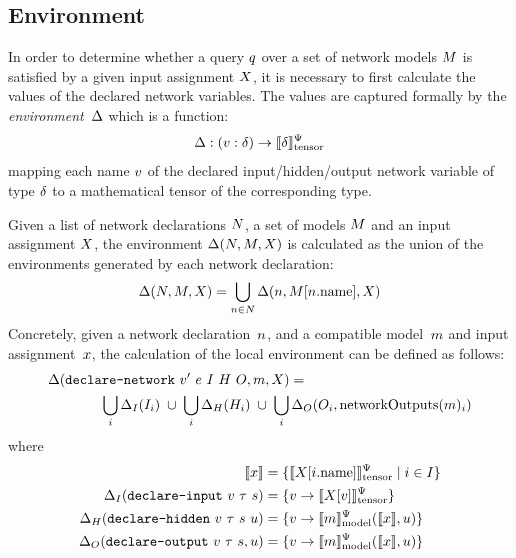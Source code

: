 \subsection{Environment}
\label{sec:semantic-context}

In order to determine whether a query $q$ over a set of network models $M$ is satisfied by a given input assignment $X$, it is necessary to first calculate the values of the declared network variables. 
The values are captured formally by the \emph{environment}~$\Delta$ which is a function:
\begin{equation*}
\Delta : (v : \delta) \rightarrow \llbracket \delta \rrbracket_\text{tensor}^\Psi
\end{equation*}
mapping each name $v$ of the declared input/hidden/output network variable of type $\delta$ to a mathematical tensor of the corresponding type.

Given a list of network declarations $N$, a set of models $M$ and an input assignment $X$, the environment $\Delta (N, M, X)$ is calculated as the union of the environments generated by each network declaration:
\begin{equation*}
\Delta (N, M, X) = \bigcup_{n \in N} \Delta (n, M[n.\text{name}], X)
\end{equation*}
Concretely, given a network declaration~$n$, and a compatible model~$m$ and input assignment~$x$, the calculation of the local environment can be defined as follows:
\begin{align*}
\Delta (\texttt{declare-network} ~ v' ~ e ~ I ~ H ~ O, m, X) =
\qquad\qquad\qquad\qquad\qquad\qquad
\\ 
\bigcup_{i} \Delta_{I}(I_i) \; \cup \;
\bigcup_{i} \Delta_{H}(H_i) \; \cup \; 
\bigcup_{i} \Delta_{O}(O_i, \text{networkOutputs}(m)_i)
\end{align*}
where
\newcommand{\nameFn}[1]{\text{name}(#1)}
\newcommand{\hiddenNameFn}[1]{\text{hiddenName}(#1)}
{\small
\begin{align*}
    \llbracket x \rrbracket 
    &= \{\llbracket X[i.\text{name}] \rrbracket_\text{tensor}^\Psi \mid i \in I \}
    \\
    \Delta_{I}(\texttt{declare-input} ~ v ~ \tau ~ s) 
    &= \{ v \rightarrow \llbracket X[v] \rrbracket_\text{tensor}^\Psi \}
    \\
    \Delta_{H}(\texttt{declare-hidden} ~ v ~ \tau ~ s ~ u) 
    &= \{ v \rightarrow \llbracket m \rrbracket_\text{model}^\Psi(\llbracket x \rrbracket, u) \}
    \\  
    \Delta_{O}(\texttt{declare-output} ~ v ~ \tau ~ s, u) 
    &= \{ v \rightarrow \llbracket m \rrbracket_\text{model}^\Psi(\llbracket x \rrbracket, u) \}
\end{align*}}

